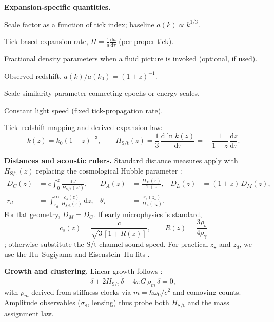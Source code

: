\noindent\textbf{Expansion-specific quantities.}
\begin{description}[leftmargin=2.4em,labelsep=0.8em]
  \item[\(a(k)\)] Scale factor as a function of tick index; baseline \(a(k)\propto k^{1/3}\).
  \item[\(H\)] Tick-based expansion rate, \(H = \frac{1}{a}\frac{\mathrm{d}a}{\mathrm{d}\tau}\) (per proper tick).
  \item[\(\Omega_\cdot\)] Fractional density parameters when a fluid picture is invoked (optional, if used).
  \item[\(z\)] Observed redshift, \(a(k)/a(k_0) = (1+z)^{-1}\).
  \item[\(\Lambda\)] Scale-similarity parameter connecting epochs or energy scales.
  \item[\(c\)] Constant light speed (fixed tick-propagation rate).
\end{description}

\noindent Tick–redshift mapping and derived expansion law:
\[
  k(z) = k_0(1+z)^{-3}, \qquad
  H_{\mathrm{S/t}}(z)
    = \frac{1}{3}\,\frac{\mathrm{d}\ln k(z)}{\mathrm{d}\tau}
    = -\,\frac{1}{1+z}\,\frac{\mathrm{d}z}{\mathrm{d}\tau}.
\]

\bigskip
\noindent\textbf{Distances and acoustic rulers.}  
Standard distance measures apply with \(H_{\mathrm{S/t}}(z)\) replacing the cosmological Hubble parameter \cite{hogg1999}:
\begin{align*}
D_C(z) &= c\int_0^{z}\frac{\mathrm{d}z'}{H_{\mathrm{S/t}}(z')}, &
D_A(z) &= \frac{D_M(z)}{1+z}, &
D_L(z) &= (1+z)\,D_M(z), \\[2pt]
r_d &= \int_{z_d}^{\infty}\frac{c_s(z)}{H_{\mathrm{S/t}}(z)}\,\mathrm{d}z, &
\theta_\star &= \frac{r_s(z_\star)}{D_A(z_\star)}.
\end{align*}
For flat geometry, \(D_M = D_C\).  
If early microphysics is standard,
\[
  c_s(z) = \frac{c}{\sqrt{3\,[1+R(z)]}},
  \qquad
  R(z) = \frac{3\rho_b}{4\rho_\gamma}
\]
\cite{husugiyama1996,eisenstein1998};  
otherwise substitute the S/t channel sound speed.  
For practical \(z_\star\) and \(z_d\), we use the Hu–Sugiyama and Eisenstein–Hu fits \cite{husugiyama1996,eisenstein1998}.

\bigskip
\noindent\textbf{Growth and clustering.}  
Linear growth follows \cite{dodelson2003}:
\[
  \ddot{\delta}
  + 2H_{\mathrm{S/t}}\,\dot{\delta}
  - 4\pi G\,\rho_m\,\delta = 0,
\]
with \(\rho_m\) derived from stiffness clocks via \(m = \hbar\omega_0/c^2\) and comoving counts.  
Amplitude observables (\(\sigma_8\), lensing) thus probe both \(H_{\mathrm{S/t}}\) and the mass assignment law.

